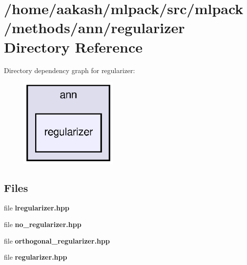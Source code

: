 \section{/home/aakash/mlpack/src/mlpack/methods/ann/regularizer Directory Reference}
\label{dir_75892c3ca3e3732c656d54ad0f76cb3e}
Directory dependency graph for regularizer\+:
\nopagebreak
\begin{figure}[H]
\begin{center}
\leavevmode
\includegraphics[width=138pt]{dir_75892c3ca3e3732c656d54ad0f76cb3e_dep}
\end{center}
\end{figure}
\subsection*{Files}
\begin{DoxyCompactItemize}
\item 
file \textbf{ lregularizer.\+hpp}
\item 
file \textbf{ no\+\_\+regularizer.\+hpp}
\item 
file \textbf{ orthogonal\+\_\+regularizer.\+hpp}
\item 
file \textbf{ regularizer.\+hpp}
\end{DoxyCompactItemize}
